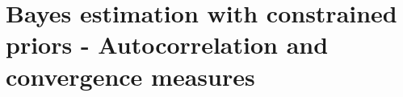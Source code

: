 
\renewcommand\chaptername{Appendix}
\chapter{Bayes estimation with constrained priors - Autocorrelation and convergence measures}
\label{apd:bayes_autocorr_convergence}


\vspace{-2em}




